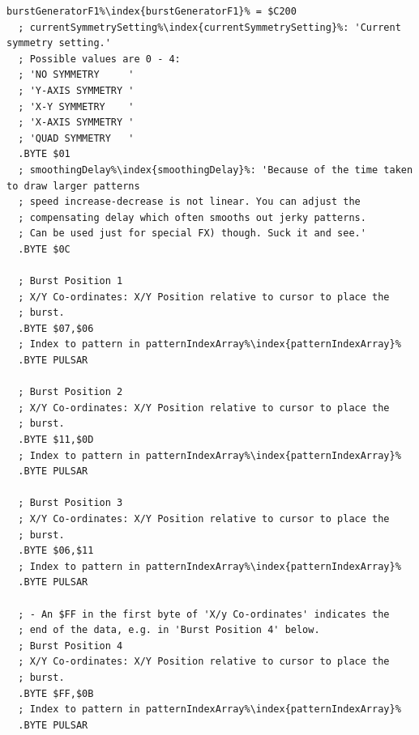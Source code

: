 \begin{lstlisting}[caption=Source code for the F1 Burst.,escapechar=\%]
burstGeneratorF1%\index{burstGeneratorF1}% = $C200
  ; currentSymmetrySetting%\index{currentSymmetrySetting}%: 'Current symmetry setting.'
  ; Possible values are 0 - 4:
  ; 'NO SYMMETRY     '
  ; 'Y-AXIS SYMMETRY '
  ; 'X-Y SYMMETRY    '
  ; 'X-AXIS SYMMETRY '
  ; 'QUAD SYMMETRY   '
  .BYTE $01
  ; smoothingDelay%\index{smoothingDelay}%: 'Because of the time taken to draw larger patterns
  ; speed increase-decrease is not linear. You can adjust the 
  ; compensating delay which often smooths out jerky patterns. 
  ; Can be used just for special FX) though. Suck it and see.'
  .BYTE $0C

  ; Burst Position 1
  ; X/Y Co-ordinates: X/Y Position relative to cursor to place the
  ; burst.
  .BYTE $07,$06
  ; Index to pattern in patternIndexArray%\index{patternIndexArray}%
  .BYTE PULSAR

  ; Burst Position 2
  ; X/Y Co-ordinates: X/Y Position relative to cursor to place the
  ; burst.
  .BYTE $11,$0D
  ; Index to pattern in patternIndexArray%\index{patternIndexArray}%
  .BYTE PULSAR

  ; Burst Position 3
  ; X/Y Co-ordinates: X/Y Position relative to cursor to place the 
  ; burst.
  .BYTE $06,$11
  ; Index to pattern in patternIndexArray%\index{patternIndexArray}%
  .BYTE PULSAR

  ; - An $FF in the first byte of 'X/y Co-ordinates' indicates the
  ; end of the data, e.g. in 'Burst Position 4' below.
  ; Burst Position 4
  ; X/Y Co-ordinates: X/Y Position relative to cursor to place the 
  ; burst.
  .BYTE $FF,$0B
  ; Index to pattern in patternIndexArray%\index{patternIndexArray}%
  .BYTE PULSAR

\end{lstlisting}

